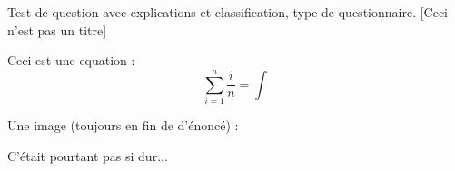 \documentclass[12pt,a4paper]{article}
\begin{document}
\begin{question}
\qoneline

Test de question avec explications et classification, type de questionnaire. [Ceci n'est pas un titre]

Ceci est une equation :
$$\sum_{i=1}^n \frac{i}{n}=\int$$

Une image (toujours en fin de d'énoncé) : 



\begin{answers}

\end{answers}

\begin{explanations}
C'était pourtant pas si dur...
\end{explanations}

\end{question}
\end{document}
